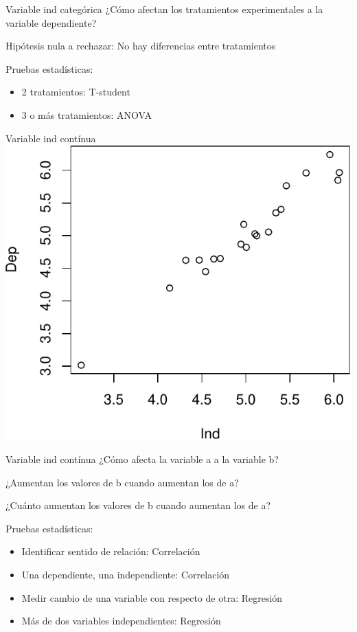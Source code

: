 \documentclass[
  11pt,
  ignorenonframetext,
]{beamer}
\providecommand{\tightlist}{%
  \setlength{\itemsep}{0pt}\setlength{\parskip}{0pt}}
\begin{document}
\begin{frame}{Variable ind categórica}
\protect\hypertarget{variable-ind-categuxf3rica-1}{}
¿Cómo afectan los tratamientos experimentales a la variable dependiente?

Hipótesis nula a rechazar: No hay diferencias entre tratamientos

Pruebas estadísticas:

\begin{itemize}
\tightlist
\item
  2 tratamientos: T-student
\item
  3 o más tratamientos: ANOVA
\end{itemize}
\end{frame}

\begin{frame}{Variable ind contínua}
\protect\hypertarget{variable-ind-contuxednua}{}
\includegraphics{Pruebas-estadisticas_files/figure-beamer/unnamed-chunk-2-1.pdf}
\end{frame}

\begin{frame}{Variable ind contínua}
\protect\hypertarget{variable-ind-contuxednua-1}{}
¿Cómo afecta la variable a a la variable b?

¿Aumentan los valores de b cuando aumentan los de a?

¿Cuánto aumentan los valores de b cuando aumentan los de a?

Pruebas estadísticas:

\begin{itemize}
\tightlist
\item
  Identificar sentido de relación: Correlación
\item
  Una dependiente, una independiente: Correlación
\item
  Medir cambio de una variable con respecto de otra: Regresión
\item
  Más de dos variables independientes: Regresión
\end{itemize}
\end{frame}
\end{document}
